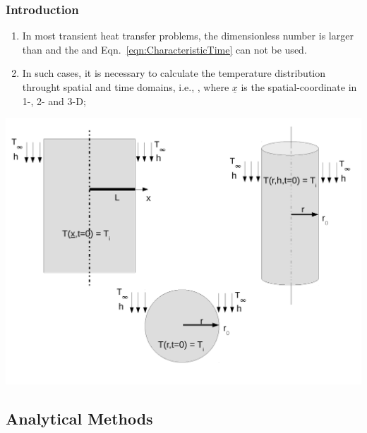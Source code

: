 \documentclass[10pt,compress,unknownkeysallowed]{beamer}
\begin{document}
\begin{frame}
 \frametitle{Introduction}
   \begin{enumerate}%
     \item<1-> In most transient heat transfer problems, the  dimensionless number is larger than  and the  and Eqn.~\ref{eqn:CharacteristicTime} can not be used.
     \item<2-> In such cases, it is necessary to calculate the temperature distribution throught spatial and time domains, i.e., , where $\underline{x}$ is the spatial-coordinate in 1-, 2- and 3-D;
   \end{enumerate}

   \begin{center}
      \includegraphics[width=0.55\columnwidth,height=0.45\columnwidth,clip]{./Pics/HT_All}
   \end{center}
\end{frame}


\subsection{Analytical Methods}
\end{document}
